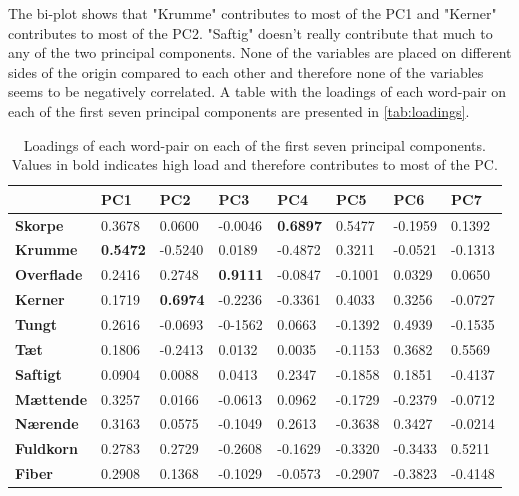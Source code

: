 \noindent
%
The bi-plot shows that "Krumme" contributes to most of the PC1 and "Kerner" contributes to most of the PC2. "Saftig" doesn't really contribute that much to any of the two principal components.
None of the variables are placed on different sides of the origin compared to each other and therefore none of the variables seems to be negatively correlated. \blankline
A table with the loadings of each word-pair on each of the first seven principal components are presented in \autoref{tab:loadings}.
%
\begin{table}[H]
\centering
\begin{tabular}{llllllll}
\hline
\textbf{}                               & \textbf{PC1}    & \textbf{PC2}    & \textbf{PC3}    & \textbf{PC4}    & \textbf{PC5} & \textbf{PC6} & \textbf{PC7} \\ \hline
\multicolumn{1}{l|}{\textbf{Skorpe}}    & 0.3678          & 0.0600          & -0.0046         & \textbf{0.6897} & 0.5477       & -0.1959      & 0.1392       \\
\multicolumn{1}{l|}{\textbf{Krumme}}    & \textbf{0.5472} & -0.5240         & 0.0189          & -0.4872         & 0.3211       & -0.0521      & -0.1313      \\
\multicolumn{1}{l|}{\textbf{Overflade}} & 0.2416          & 0.2748          & \textbf{0.9111} & -0.0847         & -0.1001      & 0.0329       & 0.0650       \\
\multicolumn{1}{l|}{\textbf{Kerner}}    & 0.1719          & \textbf{0.6974} & -0.2236         & -0.3361         & 0.4033       & 0.3256       & -0.0727      \\
\multicolumn{1}{l|}{\textbf{Tungt}}     & 0.2616          & -0.0693         & -0-1562         & 0.0663          & -0.1392      & 0.4939       & -0.1535      \\
\multicolumn{1}{l|}{\textbf{Tæt}}       & 0.1806          & -0.2413         & 0.0132          & 0.0035          & -0.1153      & 0.3682       & 0.5569       \\
\multicolumn{1}{l|}{\textbf{Saftigt}}   & 0.0904          & 0.0088          & 0.0413          & 0.2347          & -0.1858      & 0.1851       & -0.4137      \\
\multicolumn{1}{l|}{\textbf{Mættende}}  & 0.3257          & 0.0166          & -0.0613         & 0.0962          & -0.1729      & -0.2379      & -0.0712      \\
\multicolumn{1}{l|}{\textbf{Nærende}}   & 0.3163          & 0.0575          & -0.1049         & 0.2613          & -0.3638      & 0.3427       & -0.0214      \\
\multicolumn{1}{l|}{\textbf{Fuldkorn}}  & 0.2783          & 0.2729          & -0.2608         & -0.1629         & -0.3320      & -0.3433      & 0.5211       \\
\multicolumn{1}{l|}{\textbf{Fiber}}     & 0.2908          & 0.1368          & -0.1029         & -0.0573         & -0.2907      & -0.3823      & -0.4148     
\end{tabular}
\caption{Loadings of each word-pair on each of the first seven principal components. Values in bold indicates high load and therefore contributes to most of the PC.}
\label{tab:loadings}
\end{table}
